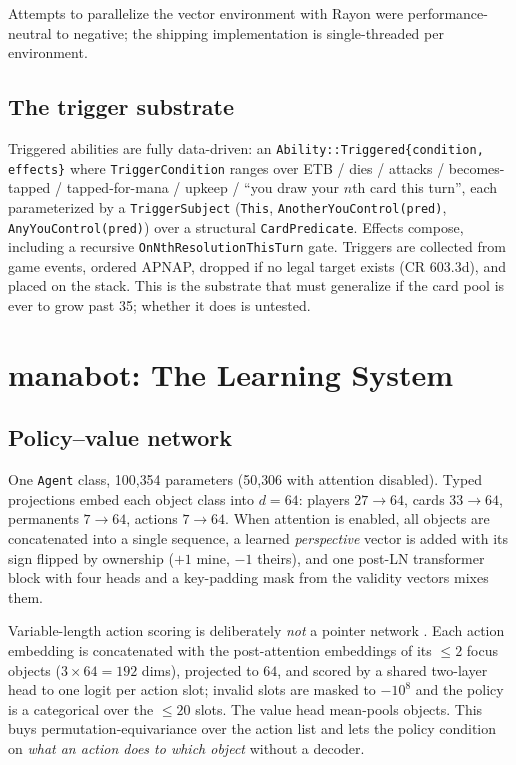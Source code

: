 \documentclass[11pt]{article}
\begin{document}
Attempts to parallelize the vector environment with Rayon were performance-neutral to negative; the shipping implementation is single-threaded per environment.

\subsection{The trigger substrate}
\label{sec:triggers}

Triggered abilities are fully data-driven: an \texttt{Ability::Triggered\{condition, effects\}} where \texttt{TriggerCondition} ranges over ETB / dies / attacks / becomes-tapped / tapped-for-mana / upkeep / ``you draw your $n$th card this turn'', each parameterized by a \texttt{TriggerSubject} (\texttt{This}, \texttt{AnotherYouControl(pred)}, \texttt{AnyYouControl(pred)}) over a structural \texttt{CardPredicate}. Effects compose, including a recursive \texttt{OnNthResolutionThisTurn} gate. Triggers are collected from game events, ordered APNAP, dropped if no legal target exists (CR 603.3d), and placed on the stack. This is the substrate that must generalize if the card pool is ever to grow past 35; whether it does is untested.

\section{manabot: The Learning System}
\label{sec:manabot}

\subsection{Policy--value network}
\label{sec:net}

One \texttt{Agent} class, 100{,}354 parameters (50{,}306 with attention disabled). Typed projections embed each object class into $d=64$: players $27\to64$, cards $33\to64$, permanents $7\to64$, actions $7\to64$. When attention is enabled, all objects are concatenated into a single sequence, a learned \emph{perspective} vector is added with its sign flipped by ownership ($+1$ mine, $-1$ theirs), and one post-LN transformer block \citep{vaswani2017attention} with four heads and a key-padding mask from the validity vectors mixes them.

Variable-length action scoring is deliberately \emph{not} a pointer network \citep{vinyals2015pointer}. Each action embedding is concatenated with the post-attention embeddings of its $\le2$ focus objects ($3\times64=192$ dims), projected to $64$, and scored by a shared two-layer head to one logit per action slot; invalid slots are masked to $-10^8$ and the policy is a categorical over the $\le20$ slots. The value head mean-pools objects. This buys permutation-equivariance over the action list and lets the policy condition on \emph{what an action does to which object} without a decoder.
\end{document}
